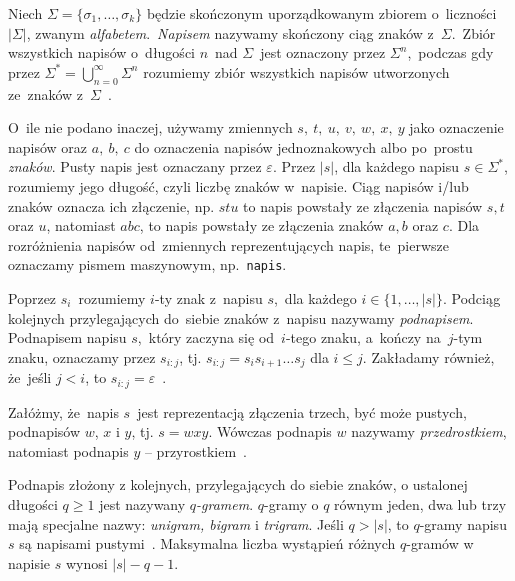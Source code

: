 \documentclass{praca1}
\begin{document}
\begin{definition}
Niech  $\Sigma = \{\sigma_1, \ldots, \sigma_k\}$ będzie skończonym uporządkowanym zbiorem o~liczności $|\Sigma|$, zwanym \emph{alfabetem}.~\emph{Napisem} nazywamy skończony ciąg znaków z~$\Sigma$.~Zbiór wszystkich napisów o~długości $n$~nad $\Sigma$~jest oznaczony przez $\Sigma^n$,~podczas gdy przez $\Sigma^* = \bigcup_{n=0}^{\infty}\Sigma^n$ rozumiemy zbiór wszystkich napisów utworzonych ze~znaków z~$\Sigma$~\cite{Boytsov2011:indexingmethods}.
\end{definition}

O~ile nie podano inaczej, używamy zmiennych $s,\ t,\ u,\ v,\ w,\ x,\ y$ jako oznaczenie napisów oraz $a,\ b,\ c$ do oznaczenia napisów jednoznakowych albo po~prostu \emph{znaków}. Pusty napis jest oznaczany przez $\varepsilon$. Przez $|s|$, dla każdego napisu $s \in \Sigma^*$, rozumiemy jego długość, czyli liczbę znaków w~napisie. Ciąg napisów i/lub znaków oznacza ich złączenie, np. $stu$ to napis powstały ze złączenia napisów $s, t$ oraz $u$, natomiast $abc$, to napis powstały ze złączenia znaków $a, b$ oraz $c$. Dla rozróżnienia napisów od~zmiennych reprezentujących napis, te~pierwsze oznaczamy pismem maszynowym, np.~\verb|napis|.

Poprzez $s_i$~rozumiemy $i$-ty znak z~napisu $s$,~dla każdego $i \in \{1,\ldots,|s|\}$. Podciąg kolejnych przylegających do~siebie znaków z~napisu nazywamy \emph{podnapisem}. Podnapisem napisu $s$,~który zaczyna się od~$i$-tego znaku, a~kończy na~$j$-tym znaku, oznaczamy przez $s_{i:j}$, tj. $s_{i:j} = s_is_{i+1}\ldots s_j$ dla $i \leq j$. Zakładamy również, że~jeśli $j < i$, to $s_{i:j} = \varepsilon$~\cite{Boytsov2011:indexingmethods,Loo2014:stringdist}.

\begin{definition}
Załóżmy, że~napis $s$~jest reprezentacją złączenia trzech, być może pustych, podnapisów $w$, $x$ i $y$, tj. $s = wxy$. Wówczas podnapis $w$ nazywamy \emph{przedrostkiem}, natomiast podnapis $y$ -- przyrostkiem~\cite{Boytsov2011:indexingmethods}.
\end{definition}

\begin{definition}
Podnapis złożony z kolejnych, przylegających do siebie znaków, o ustalonej długości $q\geq 1$ jest nazywany \emph{$q$-gramem}. $q$-gramy o $q$ równym jeden, dwa lub trzy mają specjalne nazwy: \emph{unigram, bigram} i \emph{trigram}. Jeśli $q > |s|$, to $q$-gramy napisu $s$ są napisami pustymi~\cite{Boytsov2011:indexingmethods}. Maksymalna liczba wystąpień różnych $q$-gramów w napisie $s$ wynosi $|s|-q-1$.
\end{definition}
\end{document}
